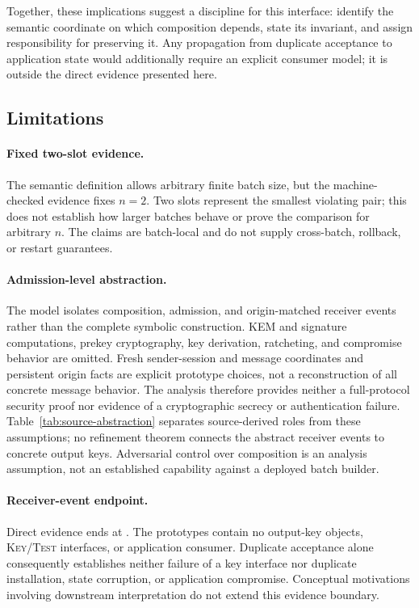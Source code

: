 Together, these implications suggest a discipline for this interface:
identify the semantic coordinate on which composition depends, state its
invariant, and assign responsibility for preserving it. Any propagation from
duplicate acceptance to application state would additionally require an
explicit consumer model; it is outside the direct evidence presented here.

\subsection{Limitations}

\paragraph{Fixed two-slot evidence.}
The semantic definition allows arbitrary finite batch size, but the
machine-checked evidence fixes \(n=2\). Two slots represent the smallest
violating pair; this does not establish how larger batches behave or prove
the comparison for arbitrary \(n\). The claims are batch-local and do not
supply cross-batch, rollback, or restart guarantees.

\paragraph{Admission-level abstraction.}
The model isolates composition, admission, and origin-matched receiver
events rather than the complete symbolic \kwaay construction. KEM and
signature computations, prekey cryptography, key derivation, ratcheting, and
compromise behavior are omitted. Fresh sender-session and message coordinates
and persistent origin facts are explicit prototype choices, not a
reconstruction of all concrete message behavior. The analysis therefore
provides neither a full-protocol security proof nor evidence of a
cryptographic secrecy or authentication failure. Table~\ref{tab:source-abstraction}
separates source-derived roles from these assumptions; no refinement theorem
connects the abstract receiver events to concrete output keys. Adversarial
control over composition is an analysis assumption, not an established
capability against a deployed batch builder.

\paragraph{Receiver-event endpoint.}
Direct evidence ends at \receiveraccept. The prototypes contain no output-key
objects, \textsc{Key}/\textsc{Test} interfaces, or application consumer.
Duplicate acceptance alone consequently establishes neither failure of a
key interface nor duplicate installation, state corruption, or application
compromise. Conceptual motivations involving downstream interpretation do
not extend this evidence boundary.

